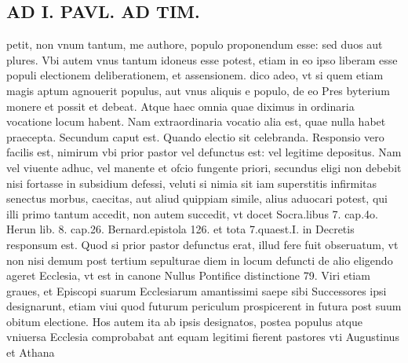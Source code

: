 \documentclass{article}
\begin{document}
\begin{pages}
\section*{AD I. PAVL. AD TIM. }\pstart petit, non vnum tantum, me authore, populo proponendum esse: sed duos aut plures. Vbi autem vnus tantum idoneus esse potest, etiam in eo ipso liberam esse populi electionem deliberationem, et assensionem. dico adeo, vt si quem etiam magis aptum agnouerit populus, aut vnus aliquis e populo, de eo Pres byterium monere et possit et debeat. Atque haec omnia quae diximus in ordinaria vocatione locum habent. Nam extraordinaria vocatio alia est, quae nulla habet praecepta. Secundum caput est. Quando electio sit celebranda. Responsio vero facilis est, nimirum vbi prior pastor vel defunctus est: vel legitime depositus. Nam vel viuente adhuc, vel manente et ofcio fungente priori, secundus eligi non debebit nisi fortasse in subsidium defessi, veluti si nimia sit iam superstitis infirmitas senectus morbus, caecitas, aut aliud quippiam simile, alius aduocari potest, qui illi primo tantum accedit, non autem succedit, vt docet Socra.libus 7. cap.4o. Herun lib.  8. cap.26. Bernard.epistola 126. et tota 7.quaest.I. in Decretis responsum est. Quod si prior pastor defunctus erat, illud fere fuit obseruatum, vt non nisi demum post tertium sepulturae diem in locum defuncti de alio eligendo ageret Ecclesia, vt est in canone Nullus Pontifice distinctione 79. Viri etiam graues, et Episcopi suarum Ecclesiarum amantissimi saepe sibi Successores ipsi designarunt, etiam viui quod futurum periculum prospicerent in futura post suum obitum electione. Hos autem ita ab ipsis designatos, postea populus atque vniuersa Ecclesia comprobabat ant equam legitimi fierent pastores vti Augustinus et Athana\pend

\end{pages}
\end{document}
